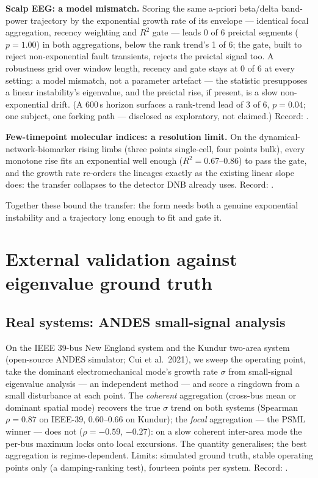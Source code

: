 \documentclass[journal]{IEEEtran}
\begin{document}
\textbf{Scalp EEG: a model mismatch.} Scoring the same a-priori
beta/delta band-power trajectory by the exponential growth rate of its
envelope --- identical focal aggregation, recency weighting and $R^2$
gate --- leads 0 of 6 preictal segments ($p = 1.00$) in both
aggregations, below the rank trend's 1 of 6; the gate, built to reject
non-exponential fault transients, rejects the preictal signal too. A
robustness grid over window length, recency and gate stays at 0 of 6 at
every setting: a model mismatch, not a parameter artefact --- the
statistic presupposes a linear instability's eigenvalue, and the
preictal rise, if present, is a slow non-exponential drift. (A 600\,s
horizon surfaces a rank-trend lead of 3 of 6, $p = 0.04$; one subject,
one forking path --- disclosed as exploratory, not claimed.) Record:
.

\textbf{Few-timepoint molecular indices: a resolution limit.} On the
dynamical-network-biomarker rising limbs (three points single-cell,
four points bulk), every monotone rise fits an exponential well enough
($R^2 = 0.67$--$0.86$) to pass the gate, and the growth rate re-orders
the lineages exactly as the existing linear slope does: the transfer
collapses to the detector DNB already uses. Record:
.

Together these bound the transfer: the form needs both a genuine
exponential instability and a trajectory long enough to fit and gate
it.

\section{External validation against eigenvalue ground truth}\label{sec:external}

\subsection{Real systems: ANDES small-signal analysis}\label{sec:andes}

On the IEEE 39-bus New England system and the Kundur two-area system
(open-source ANDES simulator; Cui et al.\ 2021), we sweep the operating
point, take the dominant electromechanical mode's growth rate $\sigma$
from small-signal eigenvalue analysis --- an independent method --- and
score a ringdown from a small disturbance at each point. The
\emph{coherent} aggregation (cross-bus mean or dominant spatial mode)
recovers the true $\sigma$ trend on both systems (Spearman
$\rho = 0.87$ on IEEE-39, 0.60--0.66 on Kundur); the \emph{focal}
aggregation --- the PSML winner --- does not ($\rho = -0.59$, $-0.27$):
on a slow coherent inter-area mode the per-bus maximum locks onto local
excursions. The quantity generalises; the best aggregation is
regime-dependent. Limits: simulated ground truth, stable operating
points only (a damping-ranking test), fourteen points per system.
Record:
.
\end{document}
